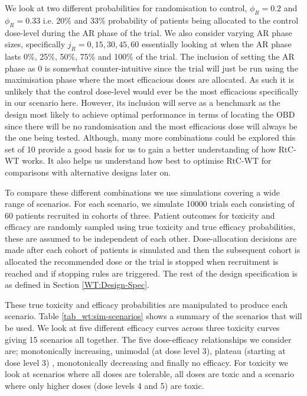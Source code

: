 We look at two different probabilities for randomisation to control, $\phi_R = 0.2$ and $\phi_R = 0.33$ i.e. 20\% and 33\% probability of patients being allocated to the control dose-level during the AR phase of the trial. We also consider varying AR phase sizes, specifically $j_R = 0, 15, 30, 45 ,60$ essentially looking at when the AR phase lasts 0\%, 25\%, 50\%, 75\% and 100\% of the trial. The inclusion of setting the AR phase as 0 is somewhat counter-intuitive since the trial will just be run using the maximisation phase where the most efficacious doses are allocated. As such it is unlikely that the control dose-level would ever be the most efficacious specifically in our scenario here. However, its inclusion will serve as a benchmark as the design most likely to achieve optimal performance in terms of locating the OBD since there will be no randomisation and the most efficacious dose will always be the one being tested. Although, many more combinations could be explored this set of 10 provide a good basis for us to gain a better understanding of how RtC-WT works. It also helps us understand how best to optimise RtC-WT for comparisons with alternative designs later on.  

To compare these different combinations we use simulations covering a wide range of scenarios. For each scenario, we simulate 10000 trials each consisting of 60 patients recruited in cohorts of three. Patient outcomes for toxicity and efficacy are randomly sampled using true toxicity and true efficacy probabilities, these are assumed to be independent of each other. Dose-allocation decisions are made after each cohort of patients is simulated and then the subsequent cohort is allocated the recommended dose or the trial is stopped when recruitment is reached and if stopping rules are triggered. The rest of the design specification is as defined in Section \ref{WT:Design-Spec}. 

These true toxicity and efficacy probabilities are manipulated to produce each scenario. Table \ref{tab_wt:sim-scenarios} shows a summary of the scenarios that will be used. We look at five different efficacy curves across three toxicity curves giving 15 scenarios all together. The five dose-efficacy relationships we consider are; monotonically increasing, unimodal (at dose level 3), plateau (starting at dose level 3) , monotonically decreasing and finally no efficacy. For toxicity we look at scenarios where all doses are tolerable, all doses are toxic and a scenario where only higher doses (dose levels 4 and 5) are toxic. 

